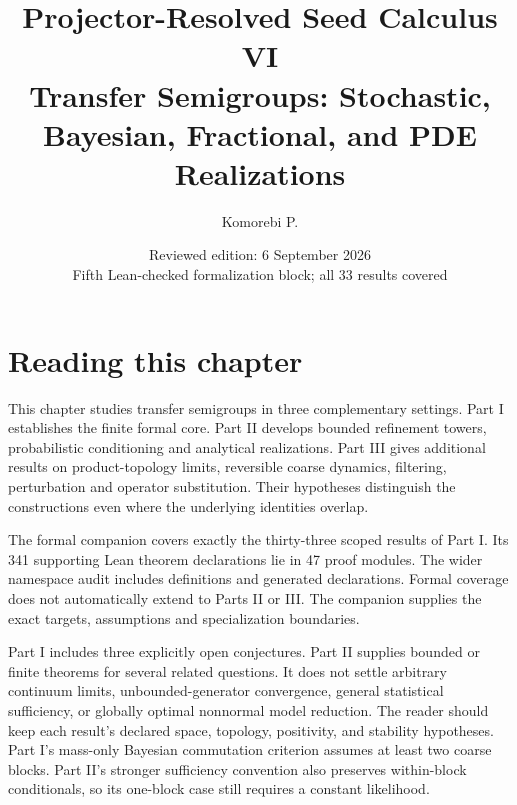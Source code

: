 \documentclass[11pt,letterpaper]{article}
\title{\textbf{Projector-Resolved Seed Calculus VI}\\[0.45em]
\large Transfer Semigroups: Stochastic, Bayesian, Fractional, and PDE Realizations}
\author{Komorebi P.}
\date{Reviewed edition: 6 September 2026\\\small Fifth Lean-checked formalization block; all 33 results covered}
\theoremstyle{plain}
\theoremstyle{plain}
\theoremstyle{plain}
\theoremstyle{definition}
\theoremstyle{definition}
\theoremstyle{definition}
\theoremstyle{definition}
\theoremstyle{definition}
\theoremstyle{remark}
\theoremstyle{remark}
\theoremstyle{remark}
\theoremstyle{remark}
\theoremstyle{remark}
\theoremstyle{remark}
\begin{document}
\KomorebiCover
{}

\section*{Reading this chapter}
This chapter studies transfer semigroups in three complementary settings. Part I establishes the finite formal core. Part II develops bounded refinement towers, probabilistic conditioning and analytical realizations. Part III gives additional results on product-topology limits, reversible coarse dynamics, filtering, perturbation and operator substitution. Their hypotheses distinguish the constructions even where the underlying identities overlap.

The formal companion covers exactly the thirty-three scoped results of Part I. Its 341 supporting Lean theorem declarations lie in 47 proof modules. The wider namespace audit includes definitions and generated declarations. Formal coverage does not automatically extend to Parts II or III. The companion supplies the exact targets, assumptions and specialization boundaries.

Part I includes three explicitly open conjectures. Part II supplies bounded or finite theorems for several related questions. It does not settle arbitrary continuum limits, unbounded-generator convergence, general statistical sufficiency, or globally optimal nonnormal model reduction. The reader should keep each result's declared space, topology, positivity, and stability hypotheses. Part I's mass-only Bayesian commutation criterion assumes at least two coarse blocks. Part II's stronger sufficiency convention also preserves within-block conditionals, so its one-block case still requires a constant likelihood.
\end{document}
